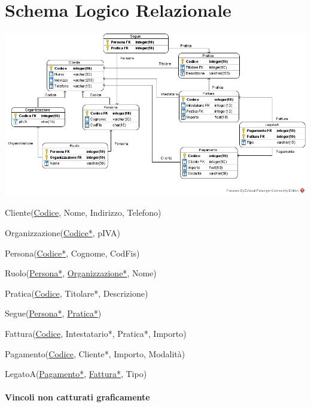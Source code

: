 \documentclass[10pt]{article}
\begin{document}
\section{Schema Logico Relazionale}
\begin{center}
	\includegraphics[scale=0.5]{LogicoRelazionale.jpg}
\end{center}
\begin{list}{}{\textbf{Notazione testuale}}
	\item Cliente(\underline{Codice}, Nome, Indirizzo, Telefono)
	\item Organizzazione(\underline{Codice*}, pIVA)
	\item Persona(\underline{Codice*}, Cognome, CodFis)
	\item Ruolo(\underline{Persona*}, \underline{Organizzazione*}, Nome)
	\item Pratica(\underline{Codice}, Titolare*, Descrizione)
	\item Segue(\underline{Persona*}, \underline{Pratica*})
	\item Fattura(\underline{Codice}, Intestatario*, Pratica*, Importo)
	\item Pagamento(\underline{Codice}, Cliente*, Importo, Modalità)
	\item LegatoA(\underline{Pagamento*}, \underline{Fattura*}, Tipo)
\end{list}
\paragraph{Vincoli non catturati graficamente}
\begin{list}{}{}
	\item
\end{list}
\pagebreak
\end{document}
